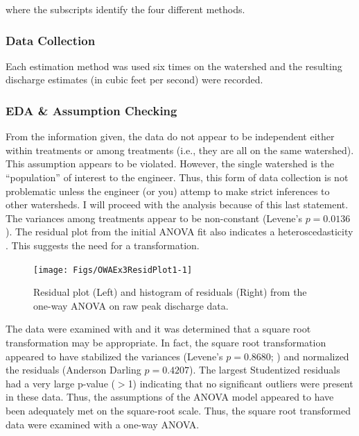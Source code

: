 \documentclass[10pt,openany]{book}\usepackage[]{graphicx}\usepackage[]{color}
\newenvironment{knitrout}{}{} %
\begin{document}
where the subscripts identify the four different methods.

\subsubsection*{Data Collection}
Each estimation method was used six times on the watershed and the resulting discharge estimates (in cubic feet per second) were recorded.

\subsubsection*{EDA \& Assumption Checking}

From the information given, the data do not appear to be independent either within treatments or among treatments (i.e., they are all on the same watershed).  This assumption appears to be violated.  However, the single watershed is the ``population'' of interest to the engineer.  Thus, this form of data collection is not problematic unless the engineer (or you) attemp to make strict inferences to other watersheds.  I will proceed with the analysis because of this last statement.  The variances among treatments appear to be non-constant (Levene's $p=0.0136$).  The residual plot from the initial ANOVA fit also indicates a heteroscedasticity .  This suggests the need for a transformation.

\begin{knitrout}
\color{fgcolor}\begin{figure}[hbtp]

{\centering \texttt{[image: Figs/OWAEx3ResidPlot1-1]} 

}

\caption[Residual plot (Left) and histogram of residuals (Right) from the one-way ANOVA on raw peak discharge data]{Residual plot (Left) and histogram of residuals (Right) from the one-way ANOVA on raw peak discharge data.}\label{fig:OWAEx3ResidPlot1}
\end{figure}


\end{knitrout}


\vspace{9pt}
The data were examined with  and it was determined that a square root transformation may be appropriate.  In fact, the square root transformation appeared to have stabilized the variances (Levene's $p=0.8680$; ) and normalized the residuals (Anderson Darling $p=0.4207$).  The largest Studentized residuals had a very large p-value ($>$1) indicating that no significant outliers were present in these data.  Thus, the assumptions of the ANOVA model appeared to have been adequately met on the square-root scale.  Thus, the square root transformed data were examined with a one-way ANOVA.
\end{document}
